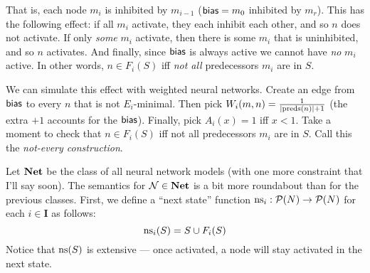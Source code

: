 \documentclass[letterpaper]{article}
\begin{document}
\begin{example*}
\begin{enumerate}
\begin{center}
        \end{center}
        
        That is, each node $m_i$ is inhibited by $m_{i-1}$ ($\mathsf{bias}=m_0$ inhibited by $m_r$).  This has the following effect: if all $m_i$ activate, they each inhibit each other, and so $n$ does not activate.  If only \emph{some} $m_i$ activate, then there is some $m_i$ that is uninhibited, and so $n$ activates.  And finally, since $\mathsf{bias}$ is always active we cannot have \emph{no} $m_i$ active.  In other words, $n \in F_i(S)$ iff \emph{not all} predecessors $m_i$ are in $S$.
        
        We can simulate this effect with weighted neural networks. Create an edge from $\mathsf{bias}$ to every $n$ that is not $E_i$-minimal. Then pick $W_i(m, n) = \frac{1}{|\mathrm{preds}(n)|+1}$ (the extra $+1$ accounts for the $\mathsf{bias}$). Finally, pick $A_i(x) = 1$ iff $x < 1$.  Take a moment to check that $n \in F_i(S)$ iff not all predecessors $m_i$ are in $S$.  Call this the \emph{not-every construction}.
    \end{enumerate}
\end{example*}

Let $\textrm{\textbf{Net}}$ be the class of all neural network models (with one more constraint that I'll say soon).  The semantics for $\mathcal{N} \in \textrm{\textbf{Net}}$ is a bit more roundabout than for the previous classes.  First, we define a ``next state'' function $\mathrm{ns}_i : \mathcal{P}(N) \to \mathcal{P}(N)$ for each $i \in \textbf{I}$ as follows:
\[
    \mathrm{ns}_i(S) = S \cup F_i(S)
\]
Notice that $\mathrm{ns}(S)$ is extensive --- once activated, a node will stay activated in the next state.
\end{document}
